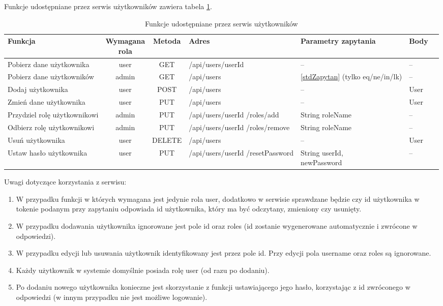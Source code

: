 \documentclass[11pt,a4paper,twoside]{article}
\begin{document}
Funkcje udostępniane przez serwis użytkowników zawiera tabela \ref{funkcjeUserWebservice}.
\begin{table}[htp]
\caption{Funkcje udostępniane przez serwis użytkowników}
\label{funkcjeUserWebservice}
\centering
\begin{tabularx}{\textwidth}{|X|c|c|X|X|l|c|}
\hline
 Funkcja & \makecell{Wymagana \\ rola} & Metoda & Adres & Parametry zapytania & Body \\\hline
 Pobierz dane użytkownika & user & GET & /api/users/{userId} & -- & -- \\\hline
 Pobierz dane użytkowników & admin & GET & /api/users & \ref{stdZapytan} (tylko eq/ne/in/lk) & -- \\\hline
  Dodaj użytkownika & user & POST & /api/users & -- & User \\\hline
   Zmień dane użytkownika & user & PUT & /api/users & -- & User \\\hline
    Przydziel rolę użytkownikowi & admin & PUT & /api/users/{userId} /roles/add & String roleName & -- \\\hline
     Odbierz rolę użytkownikowi & admin & PUT & /api/users/{userId} /roles/remove & String roleName & -- \\\hline
      Usuń użytkownika & user & DELETE & /api/users & -- & User \\\hline
  Ustaw hasło użytkownika & user & PUT & /api/users/{userId} /resetPassword & \makecell{String userId,\\ newPassword} & -- \\\hline
\end{tabularx}
\end{table}

Uwagi dotyczące korzystania z serwisu:
\begin{enumerate}
\item W przypadku funkcji w których wymagana jest jedynie rola user, dodatkowo w serwisie sprawdzane będzie czy id użytkownika w tokenie podanym przy zapytaniu odpowiada id użytkownika, który ma być odczytany, zmieniony czy usunięty.
\item W przypadku dodawania użytkownika ignorowane jest pole id oraz roles (id zostanie wygenerowane automatycznie i zwrócone w odpowiedzi).
\item W przypadku edycji lub usuwania użytkownik identyfikowany jest przez pole id. Przy edycji pola username oraz roles są ignorowane.
\item Każdy użytkownik w systemie domyślnie posiada rolę user (od razu po dodaniu).
\item Po dodaniu nowego użytkownika konieczne jest skorzystanie z funkcji ustawiającego jego hasło, korzystając z id zwróconego w odpowiedzi (w innym przypadku nie jest możliwe logowanie).
\end{enumerate}
\end{document}
